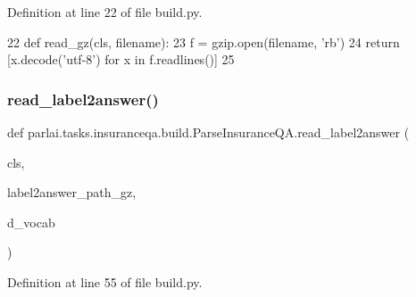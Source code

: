 Definition at line 22 of file build.\+py.


\begin{DoxyCode}
22     \textcolor{keyword}{def }read\_gz(cls, filename):
23         f = gzip.open(filename, \textcolor{stringliteral}{'rb'})
24         \textcolor{keywordflow}{return} [x.decode(\textcolor{stringliteral}{'utf-8'}) \textcolor{keywordflow}{for} x \textcolor{keywordflow}{in} f.readlines()]
25 
\end{DoxyCode}
\mbox{\label{classparlai_1_1tasks_1_1insuranceqa_1_1build_1_1ParseInsuranceQA_a24c20a520141dbc602a242780281ee6d}} 
\subsubsection{\texorpdfstring{read\+\_\+label2answer()}{read\_label2answer()}}
{\footnotesize\ttfamily def parlai.\+tasks.\+insuranceqa.\+build.\+Parse\+Insurance\+Q\+A.\+read\+\_\+label2answer (\begin{DoxyParamCaption}\item[{}]{cls,  }\item[{}]{label2answer\+\_\+path\+\_\+gz,  }\item[{}]{d\+\_\+vocab }\end{DoxyParamCaption})}



Definition at line 55 of file build.\+py.



